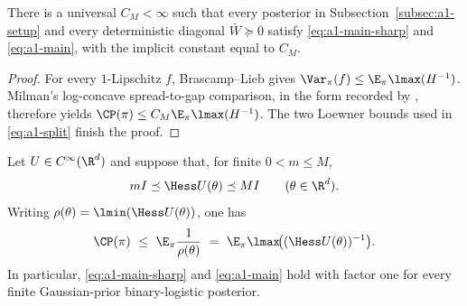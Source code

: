 \documentclass[../../main.tex]{subfiles}
\begin{document}
\begin{proposition}
\label{prop:a1-bulk-tail}
There is a universal $C_M<\infty$ such that every posterior in
Subsection~\ref{subsec:a1-setup} and every deterministic diagonal $\bar W\succeq0$ satisfy
\eqref{eq:a1-main-sharp} and \eqref{eq:a1-main}, with the implicit constant equal to $C_M$.
\end{proposition}

\begin{proof}
For every $1$-Lipschitz $f$, Brascamp--Lieb gives
$\Var_\pi(f)\le\E_\pi\lmax(H^{-1})$. Milman's log-concave spread-to-gap comparison, in the
form recorded by \cite{cattiaux2018poincare}, therefore yields
$\CP(\pi)\le C_M\E_\pi\lmax(H^{-1})$. The two Loewner bounds used in
\eqref{eq:a1-split} finish the proof.
\end{proof}

\begin{proposition}
\label{prop:a1-euclidean-harmonic}
Let $U\in C^\infty(\R^d)$ and suppose that, for finite $0<m\le M$,
\[
  mI\preceq\Hess U(\theta)\preceq MI\qquad(\theta\in\R^d).
\]
Writing $\rho(\theta)=\lmin(\Hess U(\theta))$, one has
\begin{equation}\label{eq:a1-harmonic-one}
  \CP(\pi)\ \le\ \E_\pi\frac1{\rho(\theta)}
  \ =\ \E_\pi\lmax\!\big((\Hess U(\theta))^{-1}\big).
\end{equation}
In particular, \eqref{eq:a1-main-sharp} and \eqref{eq:a1-main} hold with factor one for every
finite Gaussian-prior binary-logistic posterior.
\end{proposition}
\end{document}
